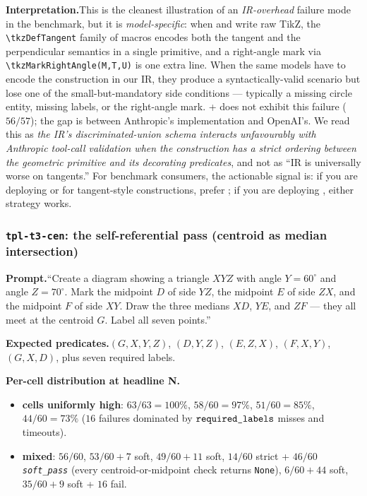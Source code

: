 \noindent\textbf{Interpretation.}\quad This is the cleanest illustration of an \emph{IR-overhead} failure mode in the benchmark, but it is \emph{model-specific}: when \opus and \sonnet write raw TikZ, the \texttt{\textbackslash tkzDefTangent} family of macros encodes both the tangent and the perpendicular semantics in a single primitive, and a right-angle mark via \texttt{\textbackslash tkzMarkRightAngle(M,T,U)} is one extra line.
When the same models have to encode the construction in our IR, they produce a syntactically-valid scenario but lose one of the small-but-mandatory side conditions --- typically a missing circle entity, missing labels, or the right-angle mark.
\gpt + \structured does not exhibit this failure ($56/57$); the gap is between Anthropic's \structured implementation and OpenAI's. We read this as \emph{the IR's discriminated-union schema interacts unfavourably with Anthropic tool-call validation when the construction has a strict ordering between the geometric primitive and its decorating predicates}, and not as ``IR is universally worse on tangents.''
For benchmark consumers, the actionable signal is: if you are deploying \opus or \sonnet for tangent-style constructions, prefer \rawcode; if you are deploying \gpt, either strategy works.

\subsubsection{\texttt{tpl-t3-cen}: the self-referential pass (centroid as median intersection)}
\label{sssec:cen_case}

\noindent\textbf{Prompt.}\quad ``Create a diagram showing a triangle $XYZ$ with angle $Y = 60^\circ$ and angle $Z = 70^\circ$. Mark the midpoint $D$ of side $YZ$, the midpoint $E$ of side $ZX$, and the midpoint $F$ of side $XY$. Draw the three medians $XD$, $YE$, and $ZF$ --- they all meet at the centroid $G$. Label all seven points.''

\noindent\textbf{Expected predicates.}\quad {}$(G, X, Y, Z)$, $(D, Y, Z)$, $(E, Z, X)$, $(F, X, Y)$, $(G, X, D)$, plus seven required labels.

\noindent\textbf{Per-cell distribution at headline N.}\quad
\begin{itemize}
\item \textbf{\structured cells uniformly high}: \sonnet $63/63 = 100\%$, \opus $58/60 = 97\%$, \haiku $51/60 = 85\%$, \gpt $44/60 = 73\%$ ($16$ failures dominated by $\texttt{required\_labels}$ misses and timeouts).
\item \textbf{\rawcode mixed}: \haiku $56/60$, \gpt $53/60 + 7$ soft, \sonnet $49/60 + 11$ soft, \opus $14/60$ strict + \emph{$46/60$ \texttt{soft\_pass}} (every centroid-or-midpoint check returns \texttt{None}), \geminipro $6/60 + 44$ soft, \geminiflash $35/60 + 9$ soft + $16$ fail.
\end{itemize}

